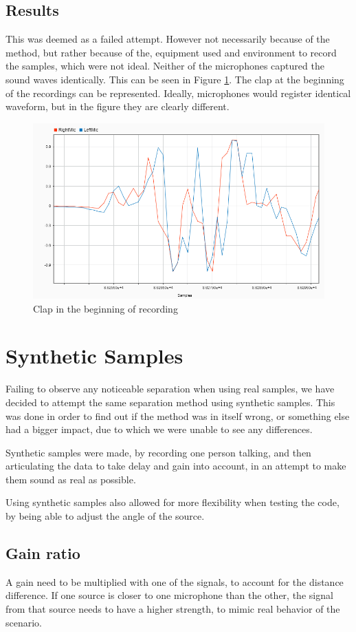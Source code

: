 \subsection*{Results}
This was deemed as a failed attempt. However not necessarily because of the method, but rather 
because of the, equipment used and environment to record the samples, which were not ideal. Neither
of the microphones captured the sound waves identically. This can be seen in Figure \ref{fig:clap}.
The clap at the beginning of the recordings can be represented. Ideally, microphones would register 
identical waveform, but in the figure they are clearly different.
\begin{figure}[htp]
  \centering
  \includegraphics[width=0.7\linewidth]{Illustrations/clap.png}
  \caption{Clap in the beginning of recording}
  \label{fig:clap}
\end{figure}
\newpage

\section{Synthetic Samples}
Failing to observe any noticeable separation when using real samples, we have decided to attempt the same
separation method using synthetic samples. This was done in order to find out if the method was in itself 
wrong, or something else had a bigger impact, due to which we were unable to see any differences.

Synthetic samples were made, by recording one person talking, and then articulating the data to take
delay and gain into account, in an attempt to make them sound as real as possible.

Using synthetic samples also allowed for more flexibility when testing the code, by being able to adjust 
the angle of the source. 
\subsection*{Gain ratio}
A gain need to be multiplied with one of the signals, to account for the distance difference. If one 
source is closer to one microphone than the other, the signal from that source needs to have a higher 
strength, to mimic real behavior of the scenario.

